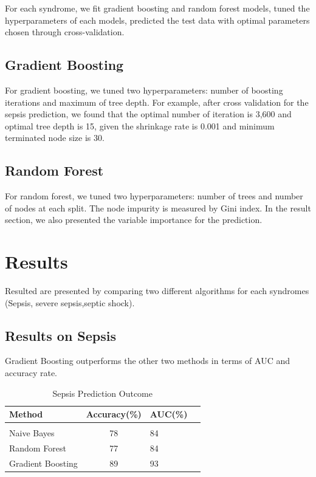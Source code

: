\documentclass[twoside,11pt]{article}
\begin{document}
For each syndrome, we fit gradient boosting and random forest models, tuned the hyperparameters of each models, predicted the test data with optimal parameters chosen through cross-validation. 

\subsection{Gradient Boosting}
For gradient boosting, we tuned two hyperparameters: number of boosting iterations and maximum of tree depth. For example, after cross validation for the sepsis prediction, we found that the optimal number of iteration is 3,600 and optimal tree depth is 15, given the shrinkage rate is 0.001 and minimum terminated node size is 30.

\subsection{Random Forest}
For random forest, we tuned two hyperparameters: number of trees and number of nodes at each split.
The node impurity is measured by Gini index. In the result section, we also presented the variable importance for the prediction.  


\section{Results} \label{results}
Resulted are presented by comparing two different algorithms for each syndromes (Sepsis, severe sepsis,septic shock). 

\subsection{Results on Sepsis} 
Gradient Boosting outperforms the other two methods in terms of AUC and accuracy rate.
\begin{table}[htbp]
  \centering 
  \begin{tabular}{lclc} 
    Method & Accuracy(\%) & AUC(\%) \\ 
    \hline \\[-11pt]
    Naive Bayes & 78 & 84 \\ 
    Random Forest & 77 & 84 \\ 
    Gradient Boosting & 89 & 93 \\ \hline 
  \end{tabular}
  \label{tab:outcome} 
    \caption{Sepsis Prediction Outcome} 
\end{table}
\end{document}
